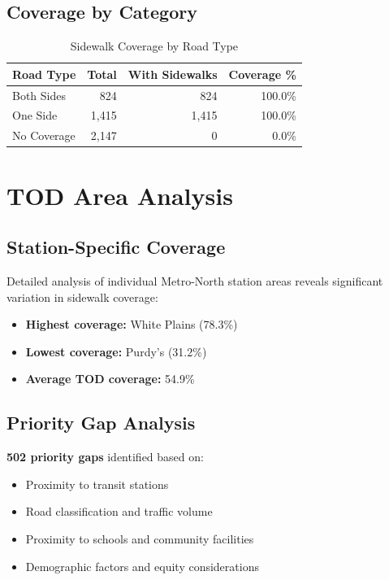 \documentclass[11pt,letterpaper]{report}
\begin{document}
\subsection{Coverage by Category}
\begin{table}[h]
\centering
\caption{Sidewalk Coverage by Road Type}
\begin{tabular}{lrrr}
\toprule
\textbf{Road Type} & \textbf{Total} & \textbf{With Sidewalks} & \textbf{Coverage \%} \\
\midrule
Both Sides & 824 & 824 & 100.0\% \\
One Side & 1,415 & 1,415 & 100.0\% \\
No Coverage & 2,147 & 0 & 0.0\% \\
\bottomrule
\end{tabular}
\end{table}

\section{TOD Area Analysis}

\subsection{Station-Specific Coverage}
Detailed analysis of individual Metro-North station areas reveals significant variation in sidewalk coverage:

\begin{itemize}
    \item \textbf{Highest coverage:} White Plains (78.3\%)
    \item \textbf{Lowest coverage:} Purdy's (31.2\%)
    \item \textbf{Average TOD coverage:} 54.9\%
\end{itemize}

\subsection{Priority Gap Analysis}
\textbf{502 priority gaps} identified based on:
\begin{itemize}
    \item Proximity to transit stations
    \item Road classification and traffic volume
    \item Proximity to schools and community facilities
    \item Demographic factors and equity considerations
\end{itemize}
\end{document}
